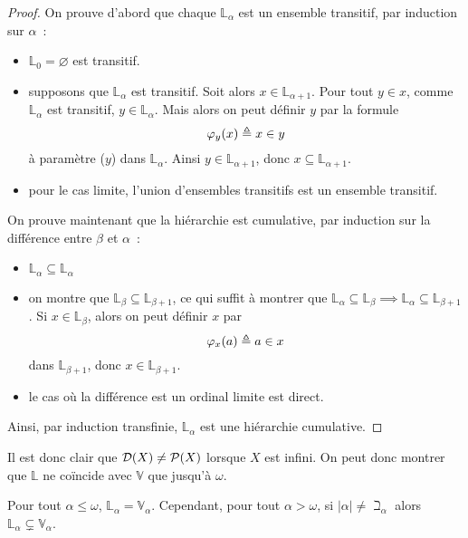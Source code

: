 \begin{proof}
  On prouve d'abord que chaque $\mathbb L_\alpha$ est un ensemble transitif,
  par induction sur $\alpha$~:
  \begin{itemize}
  \item $\mathbb L_0 = \varnothing$ est transitif.
  \item supposons que $\mathbb L_\alpha$ est transitif. Soit alors
    $x \in \mathbb L_{\alpha + 1}$. Pour tout $y \in x$, comme $\mathbb L_\alpha$
    est transitif, $y \in \mathbb L_\alpha$. Mais alors on peut définir
    $y$ par la formule
    \[\varphi_y(x) \triangleq x \in y\]
    à paramètre ($y$) dans $\mathbb L_\alpha$. Ainsi
    $y \in \mathbb L_{\alpha + 1}$, donc $x \subseteq \mathbb L_{\alpha + 1}$.
  \item pour le cas limite, l'union d'ensembles transitifs est un ensemble
    transitif.
  \end{itemize}

  On prouve maintenant que la hiérarchie est cumulative, par induction sur
  la différence entre $\beta$ et $\alpha$~:
  \begin{itemize}
  \item $\mathbb L_\alpha \subseteq \mathbb L_\alpha$
  \item on montre que $\mathbb L_{\beta}\subseteq \mathbb L_{\beta + 1}$, ce qui
    suffit à montrer que $\mathbb L_\alpha \subseteq \mathbb L_\beta \implies
    \mathbb L_\alpha \subseteq \mathbb L_{\beta + 1}$.
    Si $x \in \mathbb L_{\beta}$, alors on peut définir $x$ par
    \[\varphi_x(a) \triangleq a \in x\]
    dans $\mathbb L_{\beta + 1}$, donc $x \in \mathbb L_{\beta + 1}$.
  \item le cas où la différence est un ordinal limite est direct.
  \end{itemize}
  Ainsi, par induction transfinie, $\mathbb L_\alpha$ est une hiérarchie
  cumulative.
\end{proof}

Il est donc clair que $\mathcal{D}(X)\neq \mathcal{P}(X)$ lorsque $X$ est infini.
On peut donc montrer que $\mathbb L$ ne coïncide avec $\mathbb V$ que jusqu'à
$\omega$.

\begin{proposition}
  Pour tout $\alpha \leq \omega$, $\mathbb L_\alpha = \mathbb V_\alpha$.
  Cependant, pour tout $\alpha > \omega$, si $|\alpha| \neq \beth_\alpha$ alors
  $\mathbb L_\alpha \subsetneq \mathbb V_\alpha$.
\end{proposition}

